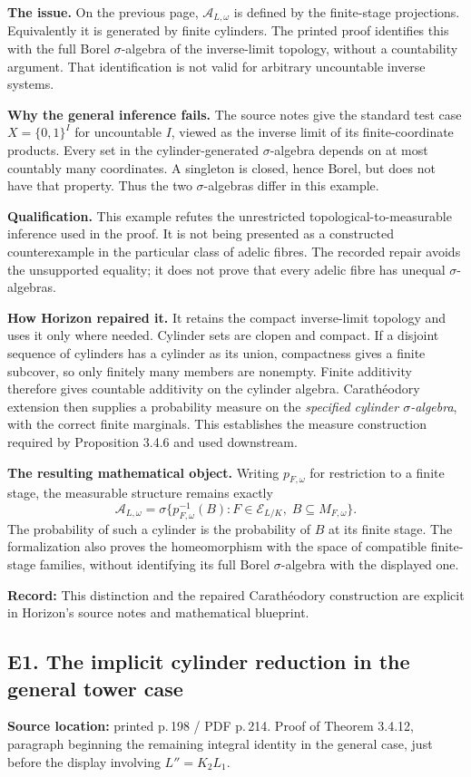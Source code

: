\documentclass[10pt,a4paper]{article}
\newcommand{\loc}[2]{\textbf{Source location:} printed p.\,#1 / PDF p.\,#2.}
\newcommand{\hist}[1]{\par{\footnotesize\color{graytext}\textbf{Record:} #1}}
\newcommand{\A}{\mathcal A}
\newcommand{\E}{\mathscr E}
\begin{document}
\textbf{The issue.} On the previous page, $\A_{L,\omega}$ is defined by
the finite-stage projections. Equivalently it is generated by finite
cylinders. The printed proof identifies this with the full Borel
$\sigma$-algebra of the inverse-limit topology, without a countability
argument. That identification is not valid for arbitrary uncountable
inverse systems.

\textbf{Why the general inference fails.} The source notes give the
standard test case $X=\{0,1\}^{I}$ for uncountable $I$, viewed as the
inverse limit of its finite-coordinate products. Every set in the
cylinder-generated $\sigma$-algebra depends on at most countably many
coordinates. A singleton is closed, hence Borel, but does not have that
property. Thus the two $\sigma$-algebras differ in this example.

\textbf{Qualification.} This example refutes the unrestricted
topological-to-measurable inference used in the proof. It is not being
presented as a constructed counterexample in the particular class of
adelic fibres. The recorded repair avoids the unsupported equality;
it does not prove that every adelic fibre has unequal $\sigma$-algebras.

\textbf{How Horizon repaired it.} It retains the compact inverse-limit
topology and uses it only where needed. Cylinder sets are clopen and
compact. If a disjoint sequence of cylinders has a cylinder as its union,
compactness gives a finite subcover, so only finitely many members are
nonempty. Finite additivity therefore gives countable additivity on the
cylinder algebra. Carath\'eodory extension then supplies a probability
measure on the \emph{specified cylinder $\sigma$-algebra}, with the
correct finite marginals. This establishes the measure construction
required by Proposition 3.4.6 and used downstream.

\textbf{The resulting mathematical object.} Writing $p_{F,\omega}$ for
restriction to a finite stage, the measurable structure remains exactly
\[
 \A_{L,\omega}
 =\sigma\bigl\{p_{F,\omega}^{-1}(B):F\in\E_{L/K},\;
 B\subseteq M_{F,\omega}\bigr\}.
\]
The probability of such a cylinder is the probability of $B$ at its
finite stage. The formalization also proves the homeomorphism with the
space of compatible finite-stage families, without identifying its full
Borel $\sigma$-algebra with the displayed one.
\hist{This distinction and the repaired Carath\'eodory construction are
explicit in Horizon's source notes and mathematical blueprint.}

\subsection{E1. The implicit cylinder reduction in the general tower case}\label{e1}
\loc{198}{214}
Proof of Theorem 3.4.12, paragraph beginning the remaining integral
identity in the general case, just before the display involving $L''=K_2L_1$.
\end{document}
